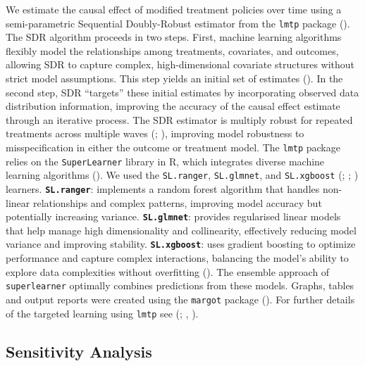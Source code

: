 \documentclass[
  single column]{article}
\begin{document}
We estimate the causal effect of modified treatment policies over time
using a semi-parametric Sequential Doubly-Robust estimator from the
\texttt{lmtp} package (). The SDR algorithm proceeds in two steps. First, machine learning
algorithms flexibly model the relationships among treatments,
covariates, and outcomes, allowing SDR to capture complex,
high-dimensional covariate structures without strict model assumptions.
This step yields an initial set of estimates
(). In the second
step, SDR ``targets'' these initial estimates by incorporating observed
data distribution information, improving the accuracy of the causal
effect estimate through an iterative process. The SDR estimator is
multiply robust for repeated treatments across multiple waves
(;
), improving model
robustness to misspecification in either the outcome or treatment model.
The \texttt{lmtp} package relies on the \texttt{SuperLearner} library in
R, which integrates diverse machine learning algorithms
(). We used
the \texttt{SL.ranger}, \texttt{SL.glmnet}, and \texttt{SL.xgboost}
(;
;
) learners.
\textbf{\texttt{SL.ranger}}: implements a random forest algorithm that
handles non-linear relationships and complex patterns, improving model
accuracy but potentially increasing variance.
\textbf{\texttt{SL.glmnet}}: provides regularised linear models that
help manage high dimensionality and collinearity, effectively reducing
model variance and improving stability. \textbf{\texttt{SL.xgboost}}:
uses gradient boosting to optimize performance and capture complex
interactions, balancing the model's ability to explore data complexities
without overfitting (). The ensemble approach of \texttt{superlearner} optimally
combines predictions from these models. Graphs, tables and output
reports were created using the \texttt{margot} package
(). For further details of the
targeted learning using \texttt{lmtp} see
(;
,
).

\subsection{Sensitivity Analysis}\label{sensitivity-analysis}
\end{document}
